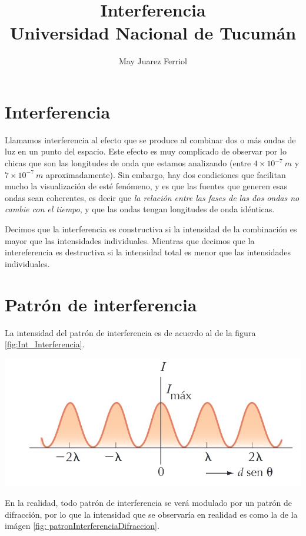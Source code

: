 \documentclass[a4paper,12pt]{article}
\title{ Interferencia \\ 
\medskip \large Universidad Nacional de Tucumán}
\author{May Juarez Ferriol}
\date{}
\newenvironment{Figure}
  {\par\medskip\noindent\minipage{\linewidth}}
  {\endminipage\par\medskip}
\begin{document}
\maketitle

\section*{Interferencia}

    Llamamos interferencia al efecto que se produce al combinar dos o más ondas de luz en un punto del espacio. Este efecto es muy complicado de observar por lo chicas que son las longitudes de onda que estamos analizando (entre $4 \times 10^{-7}\ m$ y $7 \times 10^{-7}\ m$ aproximadamente). Sin embargo, hay dos condiciones que facilitan mucho la visualización de esté fenómeno, y es que las fuentes que generen esas ondas sean coherentes, es decir que \emph{la relación entre las fases de las dos ondas no cambie con el tiempo}, y que las ondas tengan longitudes de onda idénticas.

    Decimos que la interferencia es constructiva si la intensidad de la combinación es mayor que las intensidades individuales. Mientras que decimos que la intereferencia es destructiva si la intensidad total es menor que las intensidades individuales.

\section*{Patrón de interferencia}

    La intensidad del patrón de interferencia es de acuerdo al de la figura \ref{fig:Int_Interferencia}.

    \begin{Figure}
        \centering
        \includegraphics[width=0.75\linewidth]{Intensidad_interferencia.jpg}
        \label{fig:Int_Interferencia}
    \end{Figure}

    En la realidad, todo patrón de interferencia se verá modulado por un patrón de difracción, por lo que la intensidad que se observaría en realidad es como la de la imágen \ref{fig: patronInterferenciaDifraccion}.
\end{document}
